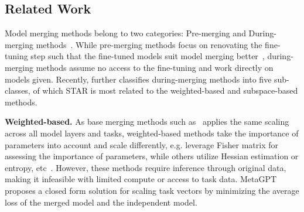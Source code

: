

\subsection{Related Work}

Model merging methods belong to two categories: Pre-merging and During-merging methods~\cite{yang2024model}. While pre-merging methods focus on renovating the fine-tuning step such that the fine-tuned models suit model merging better~\cite{ortiz2024task,imfeld2023transformer,guerrero2022re}, during-merging methods assume no access to the fine-tuning and work directly on models given. Recently, \citet{yang2024model} further classifies during-merging methods into five sub-classes,
of which STAR is most related to the weighted-based and subspace-based methods.

\noindent\textbf{Weighted-based.}
As base merging methods such as~\citet{ilharco2022editing} applies the same scaling across all model layers and tasks, weighted-based methods take the importance of parameters into account and scale differently, e.g. \citet{matena2022merging,tam2024merging} leverage Fisher matrix for assessing the importance of parameters, while others utilize Hessian estimation or entropy, etc~\cite{daheim2023model,yang2023adamerging}. 
However, these methods require inference through original data, making it infeasible with limited compute or access to task data.
MetaGPT~\cite{zhou2024metagpt} proposes a closed form solution for scaling task vectors by minimizing the average loss of the merged model and the independent model.  

